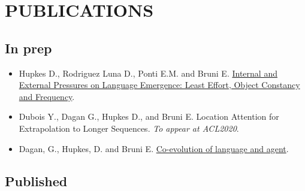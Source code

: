 \section{PUBLICATIONS}

\subsection{In prep}

\begin{itemize}
\setlength\itemsep{5pt}
    \item Hupkes D., Rodriguez Luna D., Ponti E.M. and Bruni E. \href{https://arxiv.org/pdf/2004.03868.pdf}{Internal and External Pressures on Language Emergence: Least Effort, Object Constancy and Frequency}.

    \item Dubois Y., Dagan G., Hupkes D., and Bruni E. Location Attention for Extrapolation to Longer Sequences. \textit{To appear at ACL2020}.
        
    \item Dagan, G., Hupkes, D. and Bruni E. \href{https://arxiv.org/pdf/2001.03361.pdf}{Co-evolution of language and agent}.

\end{itemize}

\subsection{Published}

